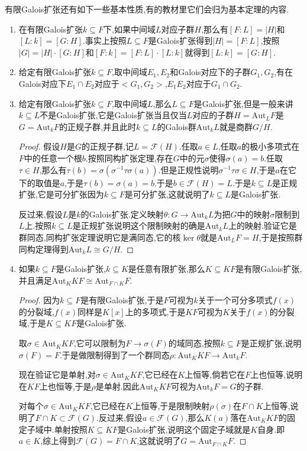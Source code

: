有限Galois扩张还有如下一些基本性质,有的教材里它们会归为基本定理的内容.
\begin{enumerate}
	\item 在有限Galois扩张$k\subseteq F$下,如果中间域$L$对应子群$H$,那么有$[F:L]=|H|$和$[L:k]=[G:H]$.事实上按照$L\subseteq F$是Galois扩张得到$|H|=[F:L]$,按照$|G|=|H|\cdot[G:H]$和$[F:k]=[F:L]\cdot[L:k]$就得到$[L:k]=[G:H]$.
	\item 给定有限Galois扩张$k\subseteq F$,取中间域$E_1,E_2$和Galois对应下的子群$G_1,G_2$,有在Galois对应下$E_1\cap E_2$对应于$<G_1,G_2>$,$E_1E_2$对应于$G_1\cap G_2$.
	\item 给定有限Galois扩张$k\subseteq F$,取中间域$L$,那么$L\subseteq F$是Galois扩张,但是一般来讲$k\subseteq L$不是Galois扩张,它是Galois扩张当且仅当$L$对应的子群$H=\mathrm{Aut}_LF$是$G=\mathrm{Aut}_kF$的正规子群,并且此时$k\subseteq L$的Galois群$\mathrm{Aut}_kL$就是商群$G/H$.
	\begin{proof}
		
		假设$H$是$G$的正规子群,记$L=\mathscr{F}(H)$.任取$a\in L$,任取$a$的极小多项式在$F$中的任意一个根$b$.按照同构扩张定理,存在$G$中的元$\sigma$使得$\sigma(a)=b$.任取$\tau\in H$,那么有$\tau(b)=\sigma(\sigma^{-1}\tau\sigma(a))$.但是正规性说明$\sigma^{-1}\tau\sigma\in H$,于是$a$在它下的取值是$a$,于是$\tau(b)=\sigma(a)=b$.于是$b\in\mathscr{F}(H)=L$.于是$k\subseteq L$是正规扩张,它是可分扩张因为$k\subseteq F$是可分扩张,这就说明了$k\subseteq L$是Galois扩张.
		
		反过来,假设$L$是$k$的Galois扩张.定义映射$\theta:G\to\mathrm{Aut}_kL$为把$G$中的映射$\sigma$限制到$L$上.按照$k\subseteq L$是正规扩张说明这个限制映射的确是$\mathrm{Aut}_kL$上的映射.验证它是群同态,同构扩张定理说明它是满同态,它的核$\ker\theta$就是$\mathrm{Aut}_LF=H$,于是按照群同构定理得到$\mathrm{Aut}_kL\cong G/H$.
	\end{proof}
    \item 如果$k\subseteq F$是Galois扩张,$k\subseteq K$是任意有限扩张,那么$K\subseteq KF$是有限Galois扩张,并且满足$\mathrm{Aut}_KKF\cong\mathrm{Aut}_{F\cap K}F$.
    \begin{proof}
    	
    	因为$k\subseteq F$是有限Galois扩张,于是$F$可视为$k$关于一个可分多项式$f(x)$的分裂域,$f(x)$同样是$K[x]$上的多项式,于是$KF$可视为$K$关于$f(x)$的分裂域,于是$K\subseteq KF$是Galois扩张.
    	
    	取$\sigma\in\mathrm{Aut}_KKF$,它可以限制为$F\to\sigma(F)$的域同态,按照$k\subseteq F$是正规扩张,说明$\sigma(F)=F$.于是做限制得到了一个群同态$\rho:\mathrm{Aut}_KKF\to\mathrm{Aut}_kF$.
    	
    	现在验证它是单射,对$\sigma\in\mathrm{Aut}_KKF$,它已经在$K$上恒等,倘若它在$F$上也恒等,说明在$KF$上也恒等,于是$\rho$是单射.因此$\mathrm{Aut}_KKF$可视为$\mathrm{Aut}_kF=G$的子群.
    	
    	对每个$\sigma\in\mathrm{Aut}_KKF$,它已经在$K$上恒等,于是限制映射$\rho(\sigma)$在$F\cap K$上恒等,说明了$F\cap K\subset\mathscr{F}(G)$.反过来,假设$a\in\mathscr{F}(G)$,那么$K(a)$落在$\mathrm{Aut}_KKF$的固定子域中.单射按照$K\subseteq KF$是Galois扩张,说明这个固定子域就是$K$自身.即$a\in K$,综上得到$\mathscr{F}(G)=F\cap K$,这就说明了$G=\mathrm{Aut}_{F\cap K}F$.
    \end{proof}
\end{enumerate}


